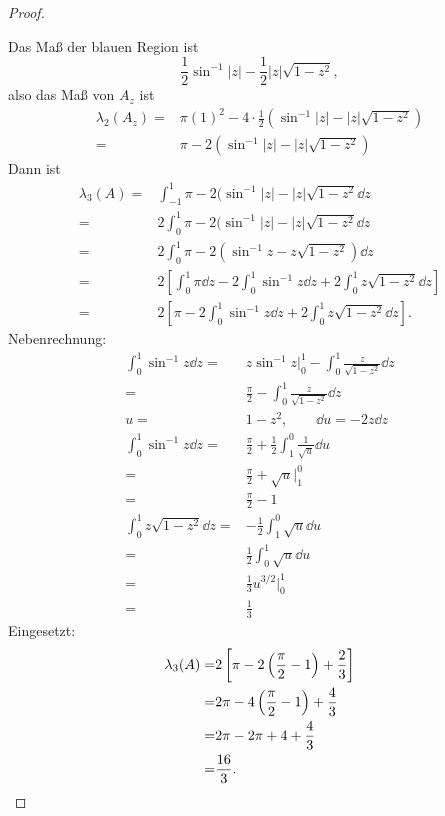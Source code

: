 \begin{proof}
\begin{center}
\begin{tikzpicture}
		\end{tikzpicture}
	\end{center}
	Das Maß der blauen Region ist
	\[
		\frac{1}{2}\sin^{-1}|z|-\frac{1}{2}|z|\sqrt{1-z^2} 
	,\]
	also das Maß von $A_z$ ist
	\begin{align*}
		\lambda_2(A_z)=&\pi(1)^2-4\cdot\frac{1}{2}\left( \sin^{-1}|z|-|z|\sqrt{1-z^2}  \right)\\
		=&\pi-2\left( \sin^{-1}|z|-|z|\sqrt{1-z^2}  \right) 
	\end{align*}
	Dann ist
	\begin{align*}
		\lambda_3(A)=&\int_{-1}^1 \pi-2(\sin^{-1}|z|-|z|\sqrt{1-z^2} \dd{z}\\
		=&2\int_0^1 \pi-2(\sin^{-1}|z|-|z|\sqrt{1-z^2} \dd{z}\\
		=&2\int_0^1\pi-2(\sin^{-1}z-z\sqrt{1-z^2}) \dd{z}\\
		=&2\left[ \int_0^1 \pi\dd{z}-2\int_0^1\sin^{-1}z\dd{z}+2\int_0^1 z\sqrt{1-z^2} \dd{z} \right]\\
		=&2\left[ \pi-2\int_0^1 \sin^{-1}z\dd{z}+2\int_0^1 z\sqrt{1-z^2} \dd{z} \right]. 
	\end{align*}
	Nebenrechnung:
	\begin{align*}
		\int_0^1 \sin^{-1}z\dd{z}=&z\sin^{-1}z|_0^1-\int_0^1 \frac{z}{\sqrt{1-z^2} }\dd{z}\\
		=&\frac{\pi}{2}-\int_0^1 \frac{z}{\sqrt{1-z^2} }\dd{z}\\
		u=&1-z^2,\qquad \dd{u}=-2z\dd{z}\\
		\int_0^1\sin^{-1}z\dd{z}=&\frac{\pi}{2}+\frac{1}{2}\int_1^0 \frac{1}{\sqrt{u} }\dd{u}\\
		=&\frac{\pi}{2}+\sqrt{u}|_1^0\\
		=&\frac{\pi}{2}-1\\
		\int_0^1 z\sqrt{1-z^2} \dd{z}=&-\frac{1}{2}\int_1^0 \sqrt{u} \dd{u}\\
		=&\frac{1}{2}\int_0^1 \sqrt{u} \dd{u}\\
		=&\frac{1}{3}u^{3 / 2}|_0^1\\
		=&\frac{1}{3}
	\end{align*}
	Eingesetzt:
	\begin{align*}
		\lambda_3(A)=&2\left[ \pi-2\left( \frac{\pi}{2}-1 \right) +\frac{2}{3} \right] \\
		=&2\pi-4\left( \frac{\pi}{2}-1 \right) +\frac{4}{3}\\
		=&2\pi-2\pi+4+\frac{4}{3}\\
		=&\frac{16}{3}.\qedhere
	\end{align*}
\end{proof}
